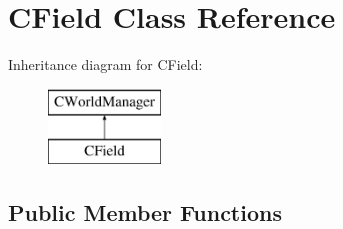 \hypertarget{class_c_field}{}\section{C\+Field Class Reference}
\label{class_c_field}
Inheritance diagram for C\+Field\+:\begin{figure}[H]
\begin{center}
\leavevmode
\includegraphics[height=2.000000cm]{class_c_field}
\end{center}
\end{figure}
\subsection*{Public Member Functions}
